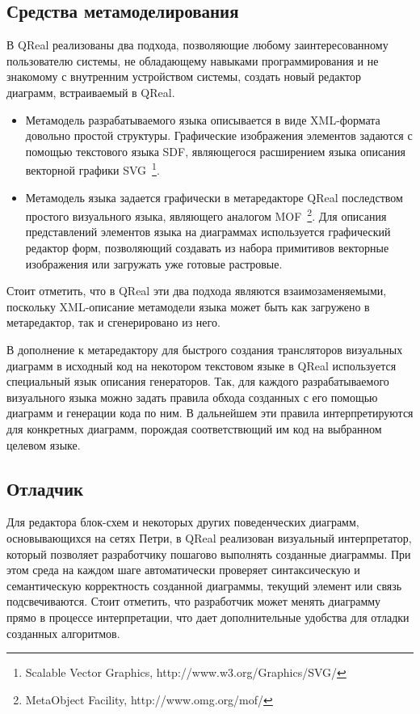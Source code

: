 \documentclass[a4paper]{article}
\begin{document}
\subsection*{Средства метамоделирования}

В QReal реализованы два подхода, позволяющие любому заинтересованному пользователю системы, не обладающему навыками программирования и не знакомому с внутренним устройством системы, создать новый редактор диаграмм, встраиваемый в QReal.
\begin{itemize}
  \item Метамодель разрабатываемого языка описывается в виде XML-формата довольно простой структуры. Графические изображения элементов задаются с помощью текстового языка SDF, являющегося расширением языка описания векторной графики SVG~\footnote{Scalable Vector Graphics, http://www.w3.org/Graphics/SVG/}.
  \item Метамодель языка задается графически в метаредакторе QReal последством простого визуального языка, являющего аналогом MOF~\footnote{MetaObject Facility, http://www.omg.org/mof/}. Для описания представлений элементов языка на диаграммах используется графический редактор форм, позволяющий создавать из набора примитивов векторные изображения или загружать уже готовые растровые.
\end{itemize}
Стоит отметить, что в QReal эти два подхода являются взаимозаменяемыми, поскольку XML-описание метамодели языка может быть как загружено в метаредактор, так и сгенерировано из него. 

В дополнение к метаредактору для быстрого создания трансляторов визуальных диаграмм в исходный код на некотором текстовом языке в QReal используется специальный язык описания генераторов. Так, для каждого разрабатываемого визуального языка можно задать правила обхода созданных с его помощью диаграмм и генерации кода по ним. В дальнейшем эти правила интерпретируются для конкретных диаграмм, порождая соответствющий им код на выбранном целевом языке.
  
\subsection*{Отладчик}

Для редактора блок-схем и некоторых других поведенческих диаграмм, основывающихся на сетях Петри, в QReal реализован визуальный интерпретатор, который позволяет разработчику пошагово выполнять созданные диаграммы. При этом среда на каждом шаге автоматически проверяет синтаксическую и семантическую корректность созданной диаграммы, текущий элемент или связь подсвечиваются. Стоит отметить, что разработчик может менять диаграмму прямо в процессе интерпретации, что дает дополнительные удобства для отладки созданных алгоритмов. 
  
\end{document}
